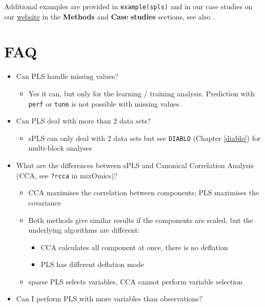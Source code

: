\documentclass[]{book}
\providecommand{\tightlist}{%
  \setlength{\itemsep}{0pt}\setlength{\parskip}{0pt}}
\begin{document}
Additional examples are provided in \texttt{example(spls)} and in our case studies on our \href{http://www.mixomics.org}{website} in the \textbf{Methods} and \textbf{Case studies} sections, see also \citep{Lec08, Lec09a}.

\hypertarget{faq-2}{%
\section{FAQ}\label{faq-2}}

\begin{itemize}
\tightlist
\item
  Can PLS handle missing values?

  \begin{itemize}
  \tightlist
  \item
    Yes it can, but only for the learning / training analysis. Prediction with \texttt{perf} or \texttt{tune} is not possible with missing values.
  \end{itemize}
\item
  Can PLS deal with more than 2 data sets?

  \begin{itemize}
  \tightlist
  \item
    sPLS can only deal with 2 data sets but see \texttt{DIABLO} (Chapter \ref{diablo}) for multi-block analyses
  \end{itemize}
\item
  What are the differences between sPLS and Canonical Correlation Analysis (CCA, see \texttt{?rcca} in mixOmics)?

  \begin{itemize}
  \tightlist
  \item
    CCA maximises the correlation between components; PLS maximises the covariance
  \item
    Both methods give similar results if the components are scaled, but the underlying algorithms are different:

    \begin{itemize}
    \tightlist
    \item
      CCA calculates all component at once, there is no deflation
    \item
      PLS has different deflation mode
    \end{itemize}
  \item
    sparse PLS selects variables, CCA cannot perform variable selection
  \end{itemize}
\item
  Can I perform PLS with more variables than observations?


\end{itemize}
\end{document}
